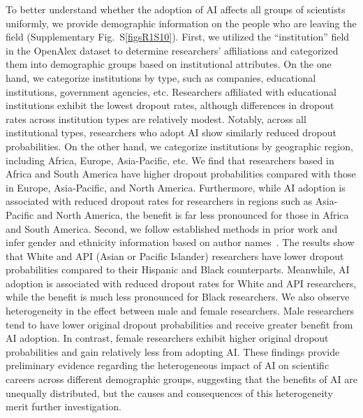 To better understand whether the adoption of AI affects all groups of scientists uniformly, we provide demographic information on the people who are leaving the field (Supplementary Fig.~S\ref{figsR1S10}).
First, we utilized the “institution” field in the OpenAlex dataset to determine researchers’ affiliations and categorized them into demographic groups based on institutional attributes.
On the one hand, we categorize institutions by type, such as companies, educational institutions, government agencies, etc.
Researchers affiliated with educational institutions exhibit the lowest dropout rates, although differences in dropout rates across institution types are relatively modest.
Notably, across all institutional types, researchers who adopt AI show similarly reduced dropout probabilities.
On the other hand, we categorize institutions by geographic region, including Africa, Europe, Asia-Pacific, etc. We find that researchers based in Africa and South America have higher dropout probabilities compared with those in Europe, Asia-Pacific, and North America.
Furthermore, while AI adoption is associated with reduced dropout rates for researchers in regions such as Asia-Pacific and North America, the benefit is far less pronounced for those in Africa and South America.
Second, we follow established methods in prior work and infer gender and ethnicity information based on author names~\supercite{lockhart2023name}.
The results show that White and API (Asian or Pacific Islander) researchers have lower dropout probabilities compared to their Hispanic and Black counterparts.
Meanwhile, AI adoption is associated with reduced dropout rates for White and API researchers, while the benefit is much less pronounced for Black researchers.
We also observe heterogeneity in the effect between male and female researchers.
Male researchers tend to have lower original dropout probabilities and receive greater benefit from AI adoption.
In contrast, female researchers exhibit higher original dropout probabilities and gain relatively less from adopting AI.
These findings provide preliminary evidence regarding the heterogeneous impact of AI on scientific careers across different demographic groups, suggesting that the benefits of AI are unequally distributed, but the causes and consequences of this heterogeneity merit further investigation.



